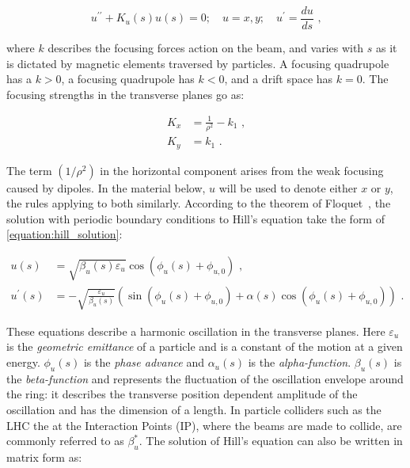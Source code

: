\begin{equation}
    u^{\prime \prime} + K_u(s) u(s) = 0; \quad u = x, y; \quad u^{\prime} = \dfrac{du}{ds} \text{ ,}
    \label{equation:hill_equation}
\end{equation}

where \(k\) describes the focusing forces action on the beam, and varies with \(s\) as it is dictated by magnetic elements traversed by particles.
A focusing quadrupole has a \(k > 0\), a focusing quadrupole has \(k < 0\), and a drift space has \(k = 0\).
The focusing strengths in the transverse planes go as:

\begin{equation}
	\begin{aligned}
		K_{x} &= \frac{1}{\rho^2} - k_{1} \text{ ,} \\
    	K_{y} &= k_{1} \text{ .}
	\end{aligned}
    \label{equation:transverse_focusing_strengths}
\end{equation}

The term \(\left(1 / \rho^2\right)\) in the horizontal component arises from the weak focusing caused by dipoles.
In the material below, \(u\) will be used to denote either \(x\) or \(y\), the rules applying to both similarly.
According to the theorem of Floquet~\cite{BOOK:Lee:Accelerator_physics}, the solution with periodic boundary conditions to Hill’s equation take the form of \cref{equation:hill_solution}:

\begin{equation}
    \begin{aligned}
        u(s)          &= \sqrt{\beta_{u}(s) \varepsilon_{u}} \cos \left( \phi_{u}(s) + \phi_{u,0} \right) \text{ ,} \\
        u^{\prime}(s) &= -\sqrt{\frac{\varepsilon_u}{\beta_u(s)}} \left( \sin \left(\phi_u(s) + \phi_{u, 0} \right) + \alpha(s) \cos \left( \phi_u(s)+\phi_{u, 0} \right) \right) \text{ .}
    \end{aligned}
    \label{equation:hill_solution}
\end{equation}

These equations describe a harmonic oscillation in the transverse planes.
Here \(\varepsilon_u\) is the \emph{geometric emittance} of a particle and is a constant of the motion at a given energy. 
\(\phi_u(s)\) is the \emph{phase advance} and \(\alpha_u(s)\) is the \emph{alpha-function}.
\(\beta_u(s)\) is the \emph{beta-function} and represents the fluctuation of the oscillation envelope around the ring: it describes the transverse position dependent amplitude of the oscillation and has the dimension of a length.
In particle colliders such as the LHC the \betafunctions at the Interaction Points (IP), where the beams are made to collide, are commonly referred to as \(\beta_u^{\ast}\).
The solution of Hill's equation can also be written in matrix form as:

